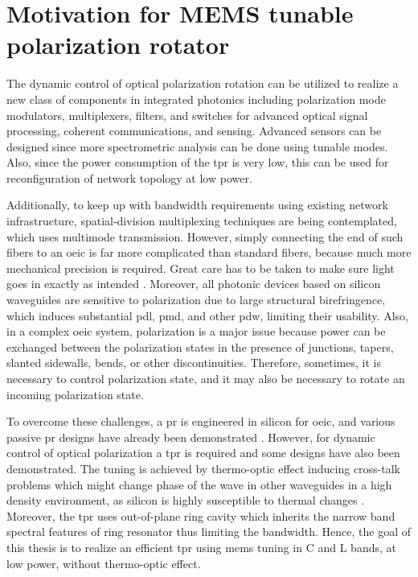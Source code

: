 \documentclass[../report.tex]{subfiles}
\begin{document}
	\section{Motivation for MEMS tunable polarization rotator} 
The dynamic control of optical polarization rotation can be utilized to realize a new class of components in integrated photonics including polarization mode modulators, multiplexers, filters, and switches for advanced optical signal processing, coherent communications, and sensing. Advanced sensors can be designed since more spectrometric analysis can be done using tunable modes. Also, since the power consumption of the \gls{tpr} is very low, this can be used for reconfiguration of network topology at low power. \par

Additionally, to keep up with bandwidth requirements using existing network infrastructure, spatial-division multiplexing techniques \cite{space_richardson_2013} are being contemplated, which uses multimode transmission. However, simply connecting the end of such fibers to an \gls{oeic} is far more complicated than standard fibers, because much more mechanical precision is required. Great care has to be taken to make sure light goes in exactly as intended \cite{hecht_is_2016}. Moreover, all photonic devices based on silicon waveguides are sensitive to polarization due to large structural birefringence, which induces substantial \gls{pdl}, \gls{pmd}, and other \gls{pdw}, limiting their usability. Also, in a complex \gls{oeic} system, polarization is a major issue because power can be exchanged between the polarization states in the presence of junctions, tapers, slanted sidewalls, bends, or other discontinuities. Therefore, sometimes, it is necessary to control polarization state, and it may also be necessary to rotate an incoming polarization state. \par

To overcome these challenges, a \gls{pr} is engineered in silicon for \gls{oeic}, and various passive \gls{pr} designs have already been demonstrated \cite{xie_efficient_2015,velasco_ultracompact_2012,leung_numerical_2011,wang_design_2014,dai_novel_2011,wirth_efficient_2012,chen_compact_2011}. However, for dynamic control of optical polarization a \gls{tpr} is required and some designs \cite{sarmiento-merenguel_demonstration_2015, xu_electrically_2014} have also been demonstrated. The tuning is achieved by thermo-optic effect inducing cross-talk problems which might change phase of the wave in other waveguides in a high density environment, as silicon is highly susceptible to thermal changes \cite{ibrahim_athermal_2012}. Moreover, the \gls{tpr} \cite{ xu_electrically_2014} uses out-of-plane ring cavity which inherits the narrow band spectral features of ring resonator thus limiting the bandwidth. Hence, the goal of this thesis is to realize an efficient \gls{tpr} using \gls{mems} tuning in C and L bands, at low power, without thermo-optic effect.
\end{document}
